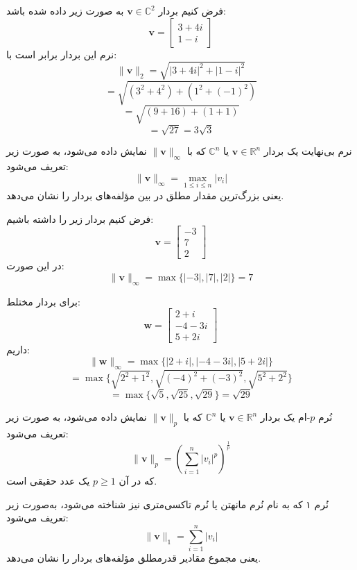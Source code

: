 \begin{example}
فرض کنیم بردار $\mathbf{v} \in \mathbb{C}^2$ به صورت زیر داده شده باشد:
\[
\mathbf{v} = \begin{bmatrix} 3 + 4i \\ 1 - i \end{bmatrix}
\]
نرم این بردار برابر است با:
\[
\|\mathbf{v}\|_2 = \sqrt{|3 + 4i|^2 + |1 - i|^2}
\]
\[
= \sqrt{(3^2 + 4^2) + (1^2 + (-1)^2)}
\]
\[
= \sqrt{(9 + 16) + (1 + 1)}
\]
\[
= \sqrt{27} = 3\sqrt{3}
\]
\end{example}
\begin{definition}[نُرم بی‌نهایت]
	نرم بی‌نهایت یک بردار $\mathbf{v} \in \mathbb{R}^n$ یا $\mathbb{C}^n$ که با $\|\mathbf{v}\|_{\infty}$ نمایش داده می‌شود، به صورت زیر تعریف می‌شود:
	\[
	\|\mathbf{v}\|_{\infty} = \max_{1 \leq i \leq n} |v_i|
	\]
	یعنی بزرگ‌ترین مقدار مطلق در بین مؤلفه‌های بردار را نشان می‌دهد.
\end{definition}
\begin{example}
	فرض کنیم بردار زیر را داشته باشیم:
	\[
	\mathbf{v} = \begin{bmatrix} -3 \\ 7 \\ 2 \end{bmatrix}
	\]
	در این صورت:
	\[
	\|\mathbf{v}\|_{\infty} = \max \{| -3 |, | 7 |, | 2 | \} = 7
	\]
	
	برای بردار مختلط:
	\[
	\mathbf{w} = \begin{bmatrix} 2 + i \\ -4 - 3i \\ 5 + 2i \end{bmatrix}
	\]
	داریم:
	\[
	\|\mathbf{w}\|_{\infty} = \max \{ |2 + i|, |-4 - 3i|, |5 + 2i| \}
	\]
	\[
	= \max \{ \sqrt{2^2 + 1^2}, \sqrt{(-4)^2 + (-3)^2}, \sqrt{5^2 + 2^2} \}
	\]
	\[
	= \max \{ \sqrt{5}, \sqrt{25}, \sqrt{29} \} = \sqrt{29}
	\]
\end{example}
\begin{definition}
نُرم $p$-ام یک بردار $\mathbf{v} \in \mathbb{R}^n$ یا $\mathbb{C}^n$ که با $\|\mathbf{v}\|_p$ نمایش داده می‌شود، به صورت زیر تعریف می‌شود:
\[
\|\mathbf{v}\|_p = \left( \sum_{i=1}^{n} |v_i|^p \right)^{\frac{1}{p}}
\]
که در آن $p \geq 1$ یک عدد حقیقی است.
\end{definition}
\begin{definition}
نُرم ۱ که به نام نُرم مانهتن یا نُرم تاکسی‌متری نیز شناخته می‌شود، به‌صورت زیر تعریف می‌شود:
\[
\|\mathbf{v}\|_1 = \sum_{i=1}^{n} |v_i|
\]
یعنی مجموع مقادیر قدرمطلق مؤلفه‌های بردار را نشان می‌دهد.

\end{definition}

